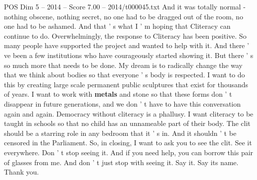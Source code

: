 \begin{textsample}{POS Dim 5 – 2014 – Score 7.00 – 2014/t000045.txt}
And it was totally normal - nothing obscene, nothing secret, no one had to be dragged out of the room, no one had to be ashamed.
And that ' s what I ' m hoping that Cliteracy can continue to do.
Overwhelmingly, the response to Cliteracy has been positive.
So many people have supported the project and wanted to help with it.
And there ' ve been a few institutions who have courageously started showing it.
But there ' s so much more that needs to be done.
My dream is to radically change the way that we think about bodies so that everyone ' s body is respected.
I want to do this by creating large scale permanent public sculptures that exist for thousands of years.
I want to work with \textbf{metals} and stone so that these forms don ' t disappear in future generations, and we don ' t have to have this conversation again and again.
Democracy without cliteracy is a phallusy.
I want cliteracy to be taught in schools so that no child has an unnameable part of their body.
The clit should be a starring role in any bedroom that it ' s in.
And it shouldn ' t be censored in the Parliament.
So, in closing, I want to ask you to see the clit.
See it everywhere.
Don ' t stop seeing it.
And if you need help, you can borrow this pair of glasses from me.
And don ' t just stop with seeing it.
Say it.
Say its name.
Thank you.

\end{textsample}
